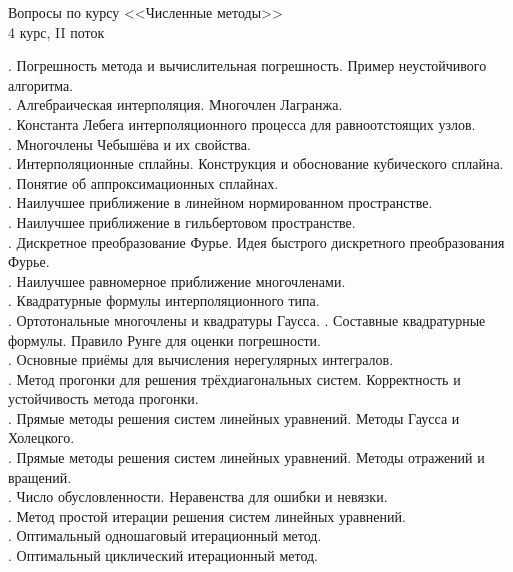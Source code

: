 \documentclass[specialist, subf, href, colorlinks=true, 14pt, times, mtpro, final]{disser}
\begin{document}
\begin{center}
    Вопросы по курсу <<Численные методы>> \\ 4 курс, II поток
\end{center}
{\small
{}. Погрешность метода и вычислительная погрешность. Пример неустойчивого алгоритма.\\
. Алгебраическая интерполяция. Многочлен Лагранжа.\\
. Константа Лебега интерполяционного процесса для равноотстоящих узлов.\\
. Многочлены Чебышёва и их свойства.\\
. Интерполяционные сплайны. Конструкция и обоснование кубического сплайна.\\
. Понятие об аппроксимационных сплайнах.\\
. Наилучшее приближение в линейном нормированном пространстве.\\
. Наилучшее приближение в гильбертовом пространстве.\\
. Дискретное преобразование Фурье. Идея быстрого дискретного преобразования Фурье.\\
. Наилучшее равномерное приближение многочленами.\\
. Квадратурные формулы интерполяционного типа.\\
. Ортотональные многочлены и квадратуры Гаусса.
. Составные квадратурные формулы. Правило Рунге для оценки погрешности.\\
. Основные приёмы для вычисления нерегулярных интегралов.\\
. Метод прогонки для решения трёхдиагональных систем. Корректность и устойчивость метода прогонки.\\
. Прямые методы решения систем линейных уравнений. Методы Гаусса и Холецкого.\\
. Прямые методы решения систем линейных уравнений. Методы отражений и вращений.\\
. Число обусловленности. Неравенства для ошибки и невязки.\\
. Метод простой итерации решения систем линейных уравнений.\\
. Оптимальный одношаговый итерационный метод.\\
. Оптимальный циклический итерационный метод.\\
}
\end{document}

